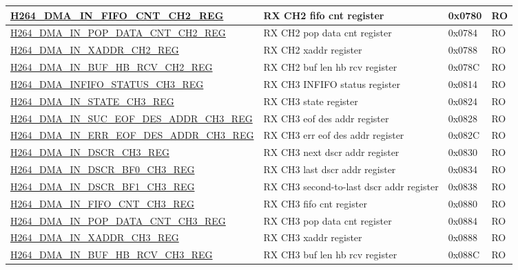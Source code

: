 \begin{longtable}{ | p{7.5cm} | p{5.7cm} | p{1.2cm} | p{1cm} | }
    \hyperref[regdesc:H264DMAINFIFOCNTCH2REG]{H264\_DMA\_IN\_FIFO\_CNT\_CH2\_REG} & RX CH2 fifo cnt register & 0x0780 & RO \\ \hline
    \hyperref[regdesc:H264DMAINPOPDATACNTCH2REG]{H264\_DMA\_IN\_POP\_DATA\_CNT\_CH2\_REG} & RX CH2 pop data cnt register & 0x0784 & RO \\ \hline
    \hyperref[regdesc:H264DMAINXADDRCH2REG]{H264\_DMA\_IN\_XADDR\_CH2\_REG} & RX CH2 xaddr register & 0x0788 & RO \\ \hline
    \hyperref[regdesc:H264DMAINBUFHBRCVCH2REG]{H264\_DMA\_IN\_BUF\_HB\_RCV\_CH2\_REG} & RX CH2 buf len hb rcv register & 0x078C & RO \\ \hline
    \hyperref[regdesc:H264DMAINFIFOSTATUSCH3REG]{H264\_DMA\_INFIFO\_STATUS\_CH3\_REG} & RX CH3 INFIFO status register & 0x0814 & RO \\ \hline
    \hyperref[regdesc:H264DMAINSTATECH3REG]{H264\_DMA\_IN\_STATE\_CH3\_REG} & RX CH3 state register & 0x0824 & RO \\ \hline
    \hyperref[regdesc:H264DMAINSUCEOFDESADDRCH3REG]{H264\_DMA\_IN\_SUC\_EOF\_DES\_ADDR\_CH3\_REG} & RX CH3 eof des addr register & 0x0828 & RO \\ \hline
    \hyperref[regdesc:H264DMAINERREOFDESADDRCH3REG]{H264\_DMA\_IN\_ERR\_EOF\_DES\_ADDR\_CH3\_REG} & RX CH3 err eof des addr register & 0x082C & RO \\ \hline
    \hyperref[regdesc:H264DMAINDSCRCH3REG]{H264\_DMA\_IN\_DSCR\_CH3\_REG} & RX CH3 next dscr addr register & 0x0830 & RO \\ \hline
    \hyperref[regdesc:H264DMAINDSCRBF0CH3REG]{H264\_DMA\_IN\_DSCR\_BF0\_CH3\_REG} & RX CH3 last dscr addr register & 0x0834 & RO \\ \hline
    \hyperref[regdesc:H264DMAINDSCRBF1CH3REG]{H264\_DMA\_IN\_DSCR\_BF1\_CH3\_REG} & RX CH3 second-to-last dscr addr register & 0x0838 & RO \\ \hline
    \hyperref[regdesc:H264DMAINFIFOCNTCH3REG]{H264\_DMA\_IN\_FIFO\_CNT\_CH3\_REG} & RX CH3 fifo cnt register & 0x0880 & RO \\ \hline
    \hyperref[regdesc:H264DMAINPOPDATACNTCH3REG]{H264\_DMA\_IN\_POP\_DATA\_CNT\_CH3\_REG} & RX CH3 pop data cnt register & 0x0884 & RO \\ \hline
    \hyperref[regdesc:H264DMAINXADDRCH3REG]{H264\_DMA\_IN\_XADDR\_CH3\_REG} & RX CH3 xaddr register & 0x0888 & RO \\ \hline
    \hyperref[regdesc:H264DMAINBUFHBRCVCH3REG]{H264\_DMA\_IN\_BUF\_HB\_RCV\_CH3\_REG} & RX CH3 buf len hb rcv register & 0x088C & RO \\ \hline

\end{longtable}

